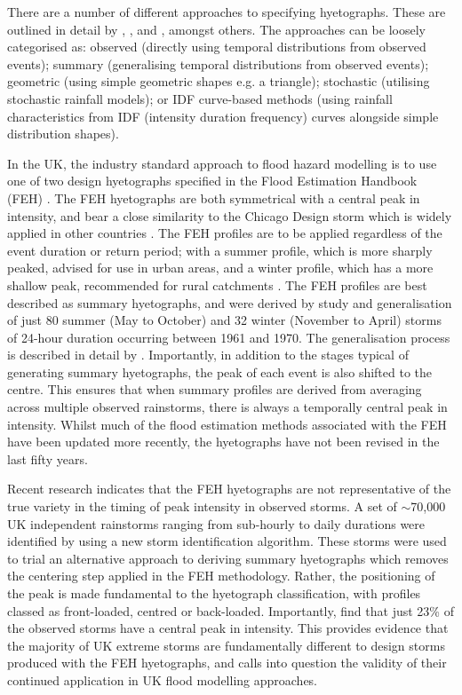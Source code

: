 \documentclass[APA,Times2COL]{WileyNJDv5}
\begin{document}
There are a number of different approaches to specifying hyetographs. These are outlined in detail by \citet{chow1988applied}, \citet{veneziano1999best}, and \citet{balbastre2019comparison}, amongst others. The approaches can be loosely categorised as: observed (directly using temporal distributions from observed events); summary (generalising temporal distributions from observed events); geometric (using simple geometric shapes e.g. a triangle); stochastic (utilising stochastic rainfall models); or IDF curve-based methods (using rainfall characteristics from IDF (intensity duration frequency) curves alongside simple distribution shapes). 

In the UK, the industry standard approach to flood hazard modelling is to use one of two design hyetographs specified in the Flood Estimation Handbook (FEH) \citep{faulkner1999}. The FEH hyetographs are both symmetrical with a central peak in intensity, and bear a close similarity to the Chicago Design storm which is widely applied in other countries \citep{keifer1957synthetic, watt2013critical, yang2020linking}. The FEH profiles are to be applied regardless of the event duration or return period; with a summer profile, which is more sharply peaked, advised for use in urban areas, and a winter profile, which has a more shallow peak, recommended for rural catchments \citep{faulkner1999}. The FEH profiles are best described as summary hyetographs, and were derived by study and generalisation of just 80 summer (May to October) and 32 winter (November to April) storms of 24-hour duration occurring between 1961 and 1970. The generalisation process is described in detail by \citet{villalobos2023towards}. Importantly, in addition to the stages typical of generating summary hyetographs, the peak of each event is also shifted to the centre. This ensures that when summary profiles are derived from averaging across multiple observed rainstorms, there is always a temporally central peak in intensity. Whilst much of the flood estimation methods associated with the FEH have been updated more recently, the hyetographs have not been revised in the last fifty years. 

Recent research indicates that the FEH hyetographs are not representative of the true variety in the timing of peak intensity in observed storms. A set of $\sim$70,000 UK independent rainstorms ranging from sub-hourly to daily durations were identified by \citet{villalobos2023creation} using a new storm identification algorithm. These storms were used to trial an alternative approach to deriving summary hyetographs which removes the centering step applied in the FEH methodology. Rather, the positioning of the peak is made fundamental to the hyetograph classification, with profiles classed as front-loaded, centred or back-loaded. Importantly, \citet{villalobos2023towards} find that just 23\% of the observed storms have a central peak in intensity. This provides evidence that the majority of UK extreme storms are fundamentally different to design storms produced with the FEH hyetographs, and calls into question the validity of their continued application in UK flood modelling approaches. 
\end{document}
